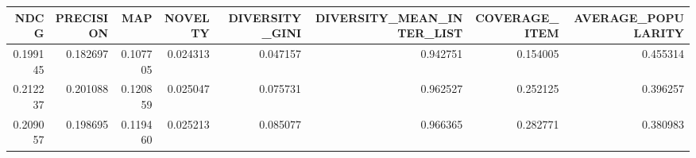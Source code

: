 \begin{tabular}{rrrrrrrr}
\toprule
    NDCG &  PRECISION &      MAP &  NOVELTY &  DIVERSITY\_GINI &  DIVERSITY\_MEAN\_INTER\_LIST &  COVERAGE\_ITEM &  AVERAGE\_POPULARITY \\
\midrule
0.199145 &   0.182697 & 0.107705 & 0.024313 &        0.047157 &                   0.942751 &       0.154005 &            0.455314 \\
0.212237 &   0.201088 & 0.120859 & 0.025047 &        0.075731 &                   0.962527 &       0.252125 &            0.396257 \\
0.209057 &   0.198695 & 0.119460 & 0.025213 &        0.085077 &                   0.966365 &       0.282771 &            0.380983 \\
\bottomrule
\end{tabular}
